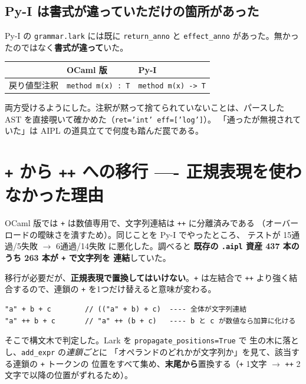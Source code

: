 \documentclass[11pt,a4paper]{ltjsarticle}
\begin{document}
\subsection{Py-I は書式が違っていただけの箇所があった}

Py-I の \texttt{grammar.lark} には既に \texttt{return\_anno} と
\texttt{effect\_anno} があった。無かったのではなく\textbf{書式が違って}いた。

\begin{center}
\small
\begin{tabular}{@{}lll@{}}
\toprule
 & OCaml 版 & Py-I \\
\midrule
戻り値型注釈 & \verb|method m(x) : T| & \verb|method m(x) -> T| \\
\bottomrule
\end{tabular}
\end{center}

両方受けるようにした。注釈が黙って捨てられていないことは、パースした
AST を直接覗いて確かめた（\texttt{ret='int' eff=['log']}）。
「通ったが無視されていた」は AIPL の道具立てで何度も踏んだ罠である。

\section{\texttt{+} から \texttt{++} への移行 ---- 正規表現を使わなかった理由}
\label{sec:migrate}

OCaml 版では \verb|+| は数値専用で、文字列連結は \verb|++| に分離済みである
（オーバーロードの曖昧さを潰すため）。同じことを Py-I でやったところ、
テストが 15通過/5失敗 $\to$ 6通過/14失敗 に悪化した。調べると
\textbf{既存の \texttt{.aipl} 資産 437 本のうち 263 本が \texttt{+} で文字列を
連結}していた。

移行が必要だが、\textbf{正規表現で置換してはいけない}。\verb|+| は左結合で
\verb|++| より強く結合するので、連鎖の \verb|+| を1つだけ替えると意味が変わる。

\begin{lstlisting}[language=AIPL]
"a" + b + c        // (("a" + b) + c)  ---- 全体が文字列連結
"a" ++ b + c       // "a" ++ (b + c)   ---- b と c が数値なら加算に化ける
\end{lstlisting}

そこで構文木で判定した。Lark を \texttt{propagate\_positions=True} で
生の木に落とし、\texttt{add\_expr} の\emph{連鎖ごと}に
「オペランドのどれかが文字列か」を見て、該当する連鎖の \verb|+| トークンの
位置をすべて集め、\textbf{末尾から}置換する（\verb|+| 1文字 $\to$
\verb|++| 2文字で以降の位置がずれるため）。
\end{document}
